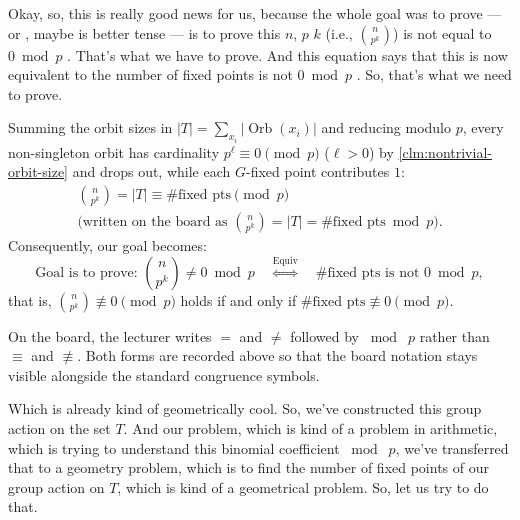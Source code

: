 \begin{proofWrapper}
\begin{speech}[00:58:20 - 00:59:55]
Okay, so, this is really good news for us, because the whole goal was to prove --- or , maybe  is better tense --- is to prove this $n$, $p$ $k$ (i.e., $\binom{n}{p^k}$) is not equal to $0 \bmod p$ . That's what we have to prove. And this equation says that this is now equivalent to the number of fixed points is not $0 \bmod p$ . So, that's what we need to prove.
\end{speech}

\begin{content}
Summing the orbit sizes in $|T| = \sum_{x_i} |\operatorname{Orb}(x_i)|$ and reducing modulo $p$, every non-singleton orbit has cardinality $p^\ell \equiv 0 \pmod{p}$ ($\ell > 0$) by \cref{clm:nontrivial-orbit-size} and drops out, while each $G$-fixed point contributes $1$:
\begin{equation}\label{eq:binomial-mod-p-fixed-pts}
\begin{gathered}
\binom{n}{p^k} = |T| \equiv \#\text{fixed pts} \pmod{p} \\
\text{(written on the board as } \binom{n}{p^k} = |T| = \#\text{fixed pts} \bmod p\text{)}.
\end{gathered}
\end{equation}
Consequently, our goal becomes:
\[
\text{Goal is to prove: } \binom{n}{p^k} \neq 0 \bmod p \quad \stackrel{\text{Equiv}}{\Longleftrightarrow} \quad \#\text{fixed pts is not } 0 \bmod p,
\]
that is, $\binom{n}{p^k} \not\equiv 0 \pmod{p}$ holds if and only if $\#\text{fixed pts} \not\equiv 0 \pmod{p}$.
\end{content}

\begin{aiNote}
On the board, the lecturer writes $=$ and $\neq$ followed by $\bmod\; p$ rather than $\equiv$ and $\not\equiv$. Both forms are recorded above so that the board notation stays visible alongside the standard congruence symbols.
\end{aiNote}

\begin{speech}[00:59:55 - 01:01:12]
Which is already kind of geometrically cool. So, we've constructed this group action on the set $T$. And our problem, which is kind of a problem in arithmetic, which is trying to understand this binomial coefficient $\bmod\; p$, we've transferred that to a geometry problem, which is to find the number of fixed points of our group action on $T$, which is kind of a geometrical problem. So, let us try to do that.


\end{speech}
\end{proofWrapper}
